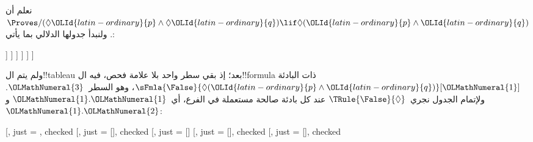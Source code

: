 \documentclass[../../../include/open-logic-section]{subfiles}
\begin{document}
{
\begin{ex}
  نعلم أن $\Proves/ (\Diamond {\OLId{latin-ordinary}{p}} \land \Diamond {\OLId{latin-ordinary}{q}}) \lif \Diamond({\OLId{latin-ordinary}{p}}
  \land {\OLId{latin-ordinary}{q}})$. ولنبدأ جدولها الدلالي بما يأتي:
  \begin{oltableau}
    [\pFmla{\False}{(\Diamond p \land \Diamond q) \lif \Diamond(p \land q)}{\OLClassicalDigits{1}},
      just = \TAss, checked
      [\pFmla{\True}{\Diamond p \land \Diamond q}{\OLClassicalDigits{1}},
        just = {\TRule{\False}{\lif}[\OLClassicalDigits{1}]}, checked
        [\pFmla{\False}{\Diamond(p \land q)}{\OLClassicalDigits{1}},
          just = {\TRule{\False}{\lif}[\OLClassicalDigits{1}]}
          [\pFmla{\True}{\Diamond p}{\OLClassicalDigits{1}},
            just = {\TRule{\True}{\land}[\OLClassicalDigits{2}]}, checked
            [\pFmla{\True}{\Diamond q}{\OLClassicalDigits{1}},
              just = {\TRule{\True}{\land}[\OLClassicalDigits{2}]}, checked
              [\pFmla{\True}{p}{\OLClassicalDigits{1}.\OLClassicalDigits{1}}, 
                just = {\TRule{\True}{\Diamond}[\OLClassicalDigits{4}]}, checked
                [\pFmla{\True}{q}{\OLClassicalDigits{1}.\OLClassicalDigits{2}}, 
                  just = {\TRule{\True}{\Diamond}[\OLClassicalDigits{5}]}, checked
                ]
              ]
            ]
          ]
        ]
      ]
    ]
  \end{oltableau}
  ولم يتم ال!!{tableau} بعد؛ إذ بقي سطر واحد بلا علامة فحص، فيه
  ال!!{formula} ذات البادئة
  $\sFmla{\False}{\Diamond({\OLId{latin-ordinary}{p}} \land {\OLId{latin-ordinary}{q}})}[{\OLMathNumeral{1}}]$، وهو السطر~${\OLMathNumeral{3}}$.
  ولإتمام الجدول نجري~$\TRule{\False}{\Diamond}$ عند كل بادئة
  صالحة مستعملة في الفرع، أي~${\OLMathNumeral{1}}.{\OLMathNumeral{1}}$ و${\OLMathNumeral{1}}.{\OLMathNumeral{2}}$:
  \begin{oltableau}
    [,
      just = \TAss, checked
      [,
        just = {\TRule{\False}{\lif}[]}, checked
        [,
          just = {\TRule{\False}{\lif}[]}
          [,
            just = {\TRule{\True}{\land}[]}, checked
            [,
              just = {\TRule{\True}{\land}[]}, checked

\end{oltableau}
\end{ex}}
\end{document}
